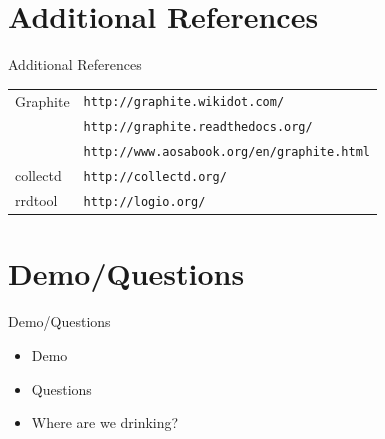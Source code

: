 \documentclass[smaller]{beamer} %
\begin{document}
\section{Additional References}
\begin{frame}{Additional References}
    \begin{tabular}{|l|l|}
        \hline
        Graphite            & {\tt http://graphite.wikidot.com/}                \\
                            & {\tt http://graphite.readthedocs.org/}            \\
                            & {\tt http://www.aosabook.org/en/graphite.html}    \\ \hline
        collectd            & {\tt http://collectd.org/}                        \\ \hline
        rrdtool             & {\tt http://logio.org/}                           \\ \hline

    \end{tabular}
\end{frame}

\section{Demo/Questions}
\begin{frame}{Demo/Questions}
    \begin{itemize}
        \item Demo
        \item Questions
        \item Where are we drinking?
    \end{itemize}
\end{frame}
\end{document}
